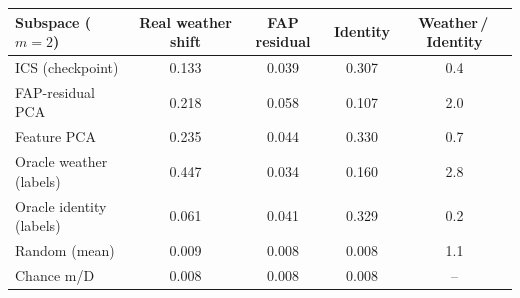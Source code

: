 \begin{tabular}{lcccc}
\toprule
Subspace ($m{=}2$) & Real weather shift & FAP residual & Identity & Weather\,/\,Identity \\
\midrule
ICS (checkpoint) & 0.133 & 0.039 & 0.307 & 0.4 \\
FAP-residual PCA & 0.218 & 0.058 & 0.107 & 2.0 \\
Feature PCA & 0.235 & 0.044 & 0.330 & 0.7 \\
Oracle weather (labels) & 0.447 & 0.034 & 0.160 & 2.8 \\
Oracle identity (labels) & 0.061 & 0.041 & 0.329 & 0.2 \\
Random (mean) & 0.009 & 0.008 & 0.008 & 1.1 \\
Chance m/D & 0.008 & 0.008 & 0.008 & -- \\
\bottomrule
\end{tabular}
